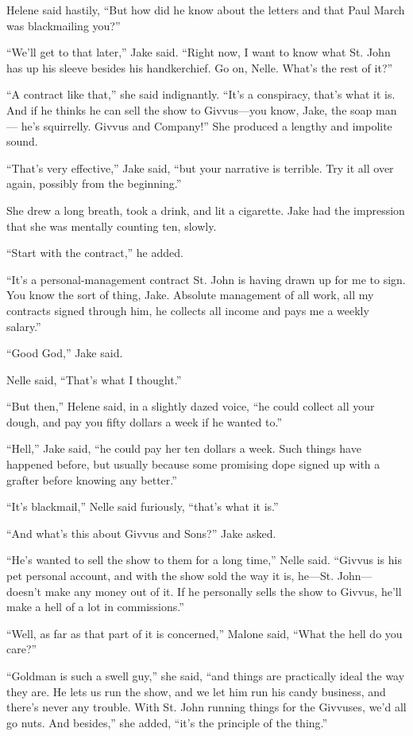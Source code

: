 \documentclass{novel}
\begin{document}
Helene said hastily, “But how did he know about the letters and that Paul March was blackmailing you?”

“We’ll get to that later,” Jake said. “Right now, I want to know what St. John has up his sleeve besides his handkerchief. Go on, Nelle. What’s the rest of it?”

“A contract like that,” she said indignantly. “It’s a conspiracy, that’s what it is. And if he thinks he can sell the show to Givvus—you know, Jake, the soap man— he’s squirrelly. Givvus and Company!” She produced a lengthy and impolite sound.

“That’s very effective,” Jake said, “but your narrative is terrible. Try it all over again, possibly from the beginning.”

She drew a long breath, took a drink, and lit a cigarette. Jake had the impression that she was mentally counting ten, slowly.

“Start with the contract,” he added.

“It’s a personal-management contract St. John is having drawn up for me to sign. You know the sort of thing, Jake. Absolute management of all work, all my contracts signed through him, he collects all income and pays me a weekly salary.”

“Good God,” Jake said.

Nelle said, “That’s what I thought.”

“But then,” Helene said, in a slightly dazed voice, “he could collect all your dough, and pay you fifty dollars a week if he wanted to.”

“Hell,” Jake said, “he could pay her ten dollars a week. Such things have happened before, but usually because some promising dope signed up with a grafter before knowing any better.”

“It’s blackmail,” Nelle said furiously, “that’s what it is.”

“And what’s this about Givvus and Sons?” Jake asked.

“He’s wanted to sell the show to them for a long time,” Nelle said. “Givvus is his pet personal account, and with the show sold the way it is, he—St. John— doesn’t make any money out of it. If he personally sells the show to Givvus, he’ll make a hell of a lot in commissions.”

“Well, as far as that part of it is concerned,” Malone said, “What the hell do you care?”

“Goldman is such a swell guy,” she said, “and things are practically ideal the way they are. He lets us run the show, and we let him run his candy business, and there’s never any trouble. With St. John running things for the Givvuses, we’d all go nuts. And besides,” she added, “it’s the principle of the thing.”
\end{document}
